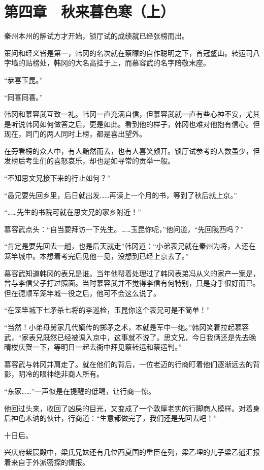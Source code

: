\section{第四章　秋来暮色寒（上）}

秦州本州的解试方才开始，锁厅试的成绩就已经张榜而出。

策问和经义皆是第一，韩冈的名次就在蔡曚的自作聪明之下，首冠鳌山。转运司八字墙的贴榜处，韩冈的大名高挂于上，而慕容武的名字陪敬末座。

“恭喜玉昆。”

“同喜同喜。”

韩冈和慕容武互致一礼。韩冈一直充满自信，但慕容武就一直有些心神不安，尤其是听说韩冈如何做答之后，更是如此。看到他的样子，韩冈也难对他抱有信心。但现在，同门的两人同时上榜，都是喜出望外。

在旁看榜的众人中，有人黯然而去，也有人喜笑颜开。锁厅试参考的人数虽少，但发榜后考生们的喜怒哀乐，却也是如寻常的贡举一般。

“不知思文兄接下来的行止如何？”

“愚兄要先回乡里，后日就出发……再读上一个月的书，等到了秋后就上京。”

“……先生的书院可就在思文兄的家乡附近！”

慕容武点头：“自当要拜访一下先生。……玉昆你呢，”他问道，“先回陇西吗？”

“肯定是要先回去一趟，也是后天就走”韩冈道：“小弟表兄就在秦州为将，人还在笼竿城中。本想着考完后见他一见，没想到已经上京去了。”

慕容武知道韩冈的表兄是谁。当年他帮着处理过了韩冈表弟冯从义的家产一案是，曾与李信父子打过照面。当时慕容武并不觉得李信有何特别，只是身手很好而已。但在德顺军笼竿城一役之后，他可不会这么说了。

“在笼竿城下七矛杀七将的李巡检，玉昆你这个表兄可是不简单！”

“当然！小弟母舅家几代嫡传的掷矛之术，本就是军中一绝。”韩冈笑着拉起慕容武，“家表兄既然已经被调入京中，这事就不说了。思文兄，今日我俩还是先去晚晴楼庆贺一下，等明日一起去衙中拜见蔡转运和蔡运判。”

慕容武与韩冈并肩走了。就在他们的背后，一位老迈的行商盯着他们逐渐远去的背影，阴冷的眼神绝非商人所有。

“东家……”一声似是在提醒的低喝，让行商一惊。

他回过头来，收回了凶戾的目光，又变成了一个敦厚老实的行脚商人模样。对着身后神色木讷的伙计，行商道：“生意都做完了，我们还是先回去吧！”

十日后。

兴庆府紫宸殿中，梁氏兄妹还有几位西夏国的重臣在列，梁乙埋的儿子梁乙逋汇报着来自于外派密探的情报。

